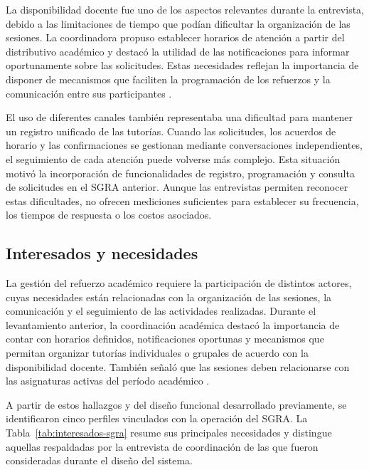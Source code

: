 La disponibilidad docente fue uno de los aspectos relevantes durante la entrevista, debido a las limitaciones de tiempo que podían dificultar la organización de las sesiones. La coordinadora propuso establecer horarios de atención a partir del distributivo académico y destacó la utilidad de las notificaciones para informar oportunamente sobre las solicitudes. Estas necesidades reflejan la importancia de disponer de mecanismos que faciliten la programación de los refuerzos y la comunicación entre sus participantes \cite{Ponce2025-Entrevista}.

El uso de diferentes canales también representaba una dificultad para mantener un registro unificado de las tutorías. Cuando las solicitudes, los acuerdos de horario y las confirmaciones se gestionan mediante conversaciones independientes, el seguimiento de cada atención puede volverse más complejo. Esta situación motivó la incorporación de funcionalidades de registro, programación y consulta de solicitudes en el SGRA anterior. Aunque las entrevistas permiten reconocer estas dificultades, no ofrecen mediciones suficientes para establecer su frecuencia, los tiempos de respuesta o los costos asociados.

\subsection{Interesados y necesidades}

La gestión del refuerzo académico requiere la participación de distintos actores, cuyas necesidades están relacionadas con la organización de las sesiones, la comunicación y el seguimiento de las actividades realizadas. Durante el levantamiento anterior, la coordinación académica destacó la importancia de contar con horarios definidos, notificaciones oportunas y mecanismos que permitan organizar tutorías individuales o grupales de acuerdo con la disponibilidad docente. También señaló que las sesiones deben relacionarse con las asignaturas activas del período académico \cite{Ponce2025-Entrevista}.

A partir de estos hallazgos y del diseño funcional desarrollado previamente, se identificaron cinco perfiles vinculados con la operación del SGRA. La Tabla~\ref{tab:interesados-sgra} resume sus principales necesidades y distingue aquellas respaldadas por la entrevista de coordinación de las que fueron consideradas durante el diseño del sistema.

